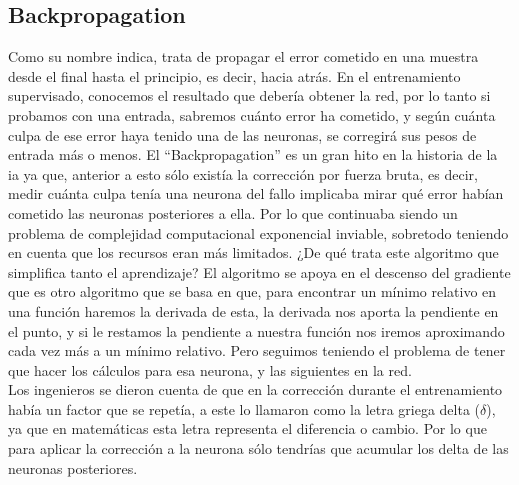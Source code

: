 \subsection{Backpropagation}
\label{marco teorico backpropagation}
Como su nombre indica, trata de propagar el error cometido en una muestra desde el final hasta el principio, es decir, hacia atrás. En el entrenamiento supervisado, conocemos el resultado que debería obtener la red, por lo tanto si probamos con una entrada, sabremos cuánto error ha cometido, y según cuánta culpa de ese error haya tenido una de las neuronas, se corregirá sus pesos de entrada más o menos.
El ``Backpropagation'' es un gran hito en la historia de la \gls{ia} ya que, anterior a esto sólo existía la corrección por fuerza bruta, es decir, medir cuánta culpa tenía una neurona del fallo implicaba mirar qué error habían cometido las neuronas posteriores a ella. Por lo que continuaba siendo un problema de complejidad computacional exponencial inviable, sobretodo teniendo en cuenta que los recursos eran más limitados.
¿De qué trata este algoritmo que simplifica tanto el aprendizaje? El algoritmo se apoya en el descenso del gradiente que es otro algoritmo que se basa en que, para encontrar un mínimo relativo en una función haremos la derivada de esta, la derivada nos aporta la pendiente en el punto, y si le restamos la pendiente a nuestra función nos iremos aproximando cada vez más a un mínimo relativo. Pero seguimos teniendo el problema de tener que hacer los cálculos para esa neurona, y las siguientes en la red.
\\
Los ingenieros se dieron cuenta de que en la corrección durante el entrenamiento había un factor que se repetía, a este lo llamaron como la letra griega delta ($\delta$), ya que en matemáticas esta letra representa el diferencia o cambio. Por lo que para aplicar la corrección a la neurona sólo tendrías que acumular los delta de las neuronas posteriores. 

